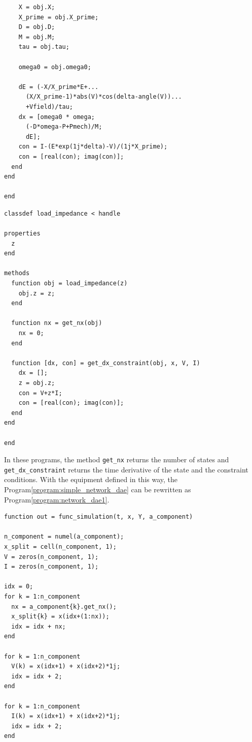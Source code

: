 \documentclass[graybox, envcountchap]{svmult}
\begin{document}
\begin{example}
\begin{PROGRAMA}[count,title={generator.m}]
\begin{verbatim}
    X = obj.X;
    X_prime = obj.X_prime;
    D = obj.D;
    M = obj.M;
    tau = obj.tau;

    omega0 = obj.omega0;

    dE = (-X/X_prime*E+...
      (X/X_prime-1)*abs(V)*cos(delta-angle(V))...
      +Vfield)/tau;
    dx = [omega0 * omega;
      (-D*omega-P+Pmech)/M;
      dE];
    con = I-(E*exp(1j*delta)-V)/(1j*X_prime);
    con = [real(con); imag(con)];
  end
end
  
end
\end{verbatim}
\end{PROGRAMA}


\smallskip
\begin{PROGRAMA}[count,title={load\_impedance.m}]\label{program:load}
\begin{verbatim}
classdef load_impedance < handle
  
properties
  z
end

methods
  function obj = load_impedance(z)
    obj.z = z;
  end

  function nx = get_nx(obj)
    nx = 0;
  end

  function [dx, con] = get_dx_constraint(obj, x, V, I)
    dx = [];
    z = obj.z;
    con = V+z*I;
    con = [real(con); imag(con)];
  end
end

end
\end{verbatim}
\end{PROGRAMA}

In these programs, the method \verb|get_nx| returns the number of states and \verb|get_dx_constraint| returns the time derivative of the state and the constraint conditions.
With the equipment defined in this way, the Program\nobreak\ref{program:simple_network_dae} can be rewritten as Program\nobreak\ref{program:network_dae1}.

\smallskip
\begin{PROGRAMA}[count,title={func\_simulation.m}]\label{program:network_dae1}
  \begin{verbatim}
function out = func_simulation(t, x, Y, a_component)

n_component = numel(a_component);
x_split = cell(n_component, 1);
V = zeros(n_component, 1);
I = zeros(n_component, 1);

idx = 0;
for k = 1:n_component
  nx = a_component{k}.get_nx();
  x_split{k} = x(idx+(1:nx));
  idx = idx + nx;
end

for k = 1:n_component
  V(k) = x(idx+1) + x(idx+2)*1j;
  idx = idx + 2;
end

for k = 1:n_component
  I(k) = x(idx+1) + x(idx+2)*1j;
  idx = idx + 2;
end


\end{verbatim}
\end{PROGRAMA}
\end{example}
\end{document}
